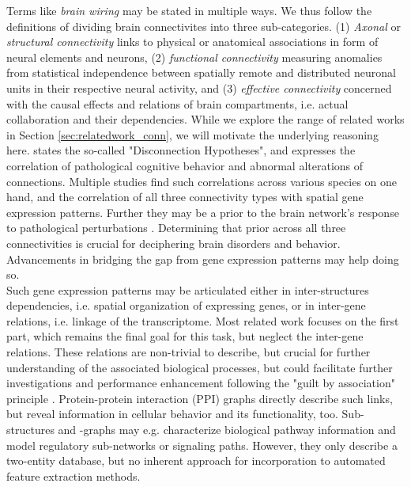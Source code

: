 \documentclass[]{article}
\renewcommand{\cite}{\citep}
\begin{document}
Terms like \textit{brain wiring} may be stated in multiple ways. We thus follow the definitions of \citet{sporns2016networks} dividing brain connectivites into three sub-categories. (1) \textit{Axonal} or \textit{structural connectivity} links to physical or anatomical associations in form of neural elements and neurons, (2) \textit{functional connectivity} measuring anomalies from statistical independence between spatially remote and distributed neuronal units in their respective neural activity, and (3) \textit{effective connectivity} concerned with the causal effects and relations of brain compartments, i.e. actual collaboration and their dependencies. While we explore the range of related works in Section \ref{sec:relatedwork_conn}, we will motivate the underlying reasoning here. \citet{friston2002dysfunctional} states the so-called "Disconnection Hypotheses", and expresses the correlation of pathological cognitive behavior and abnormal alterations of connections. Multiple studies find such correlations across various species on one hand, and the correlation of all three connectivity types with spatial gene expression patterns. Further they may be a prior to the brain network's response to pathological perturbations \cite{fornito2015connectomics}. Determining that prior across all three connectivities is crucial for deciphering brain disorders and behavior. Advancements in bridging the gap from gene expression patterns may help doing so.\\

Such gene expression patterns may be articulated either in inter-structures dependencies, i.e. spatial organization of expressing genes, or in inter-gene relations, i.e. linkage of the transcriptome. Most related work focuses on the first part, which remains the final goal for this task, but neglect the inter-gene relations. These relations are non-trivial to describe, but crucial for further understanding of the associated biological processes, but could facilitate further investigations and performance enhancement following the "guilt by association" principle \cite{Oliver2000, Gillis2012}.
Protein-protein interaction (PPI) graphs directly describe such links, but reveal information in cellular behavior and its functionality, too. Sub-structures and -graphs may e.g. characterize biological pathway information and model regulatory sub-networks or signaling paths. However, they only describe a two-entity database, but no inherent approach for incorporation to automated feature extraction methods. \\
\end{document}
